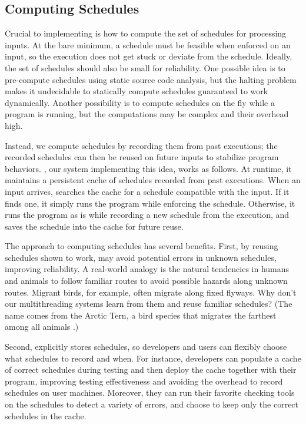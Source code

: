 \subsection{Computing Schedules} \label{sec:tern}


Crucial to implementing \smt is how to compute the set of schedules for
processing inputs.  At the bare minimum, a schedule must be feasible when
enforced on an input, so the execution does not get stuck or deviate from
the schedule.  Ideally, the set of schedules should also be small for
reliability.  One possible idea is to pre-compute schedules using static
source code analysis, but the halting problem makes it undecidable to
statically compute schedules guaranteed to work dynamically.  Another
possibility is to compute schedules on the fly while a program is running,
but the computations may be complex and their overhead high.

Instead, we compute schedules by recording them from past executions; the
recorded schedules can then be reused on future inputs to stabilize
program behaviors.  \tern, our system implementing this idea, works as
follows.  At runtime, it maintains a persistent cache of schedules
recorded from past executions.  When an input arrives, \tern searches the
cache for a schedule compatible with the input.  If it finds one, it
simply runs the program while enforcing the schedule.  Otherwise, it runs
the program as is while recording a new schedule from the execution, and
saves the schedule into the cache for future reuse.

The \tern approach to computing schedules has several benefits. First, by
reusing schedules shown to work, \tern may avoid potential errors in
unknown schedules, improving reliability.  A real-world analogy is the
natural tendencies in humans and animals to follow familiar routes to
avoid possible hazards along unknown routes.  Migrant birds, for example,
often migrate along fixed flyways.  Why don't our multithreading systems
learn from them and reuse familiar schedules?  (The name \tern comes from
the Arctic Tern, a bird species that migrates the farthest among all
animals%
.)

Second, \tern explicitly stores schedules, so developers and users can
flexibly choose what schedules to record and when.  For instance,
developers can populate a cache of correct schedules during testing and
then deploy the cache together with their program, improving testing
effectiveness and avoiding the overhead to record schedules on user
machines.  Moreover, they can run their favorite checking tools on the
schedules to detect a variety of errors, and choose to keep only the
correct schedules in the cache.

